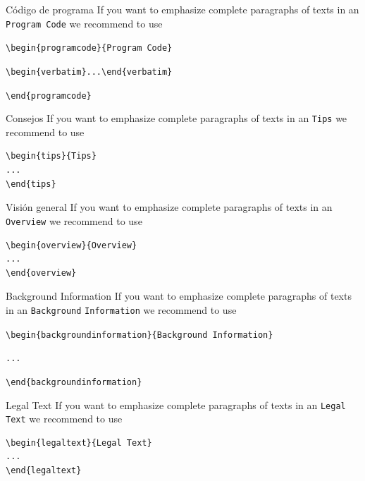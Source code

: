\begin{programcode}{Código de programa}
If you want to emphasize complete paragraphs of texts in an \verb|Program Code| we recommend to
use

\verb|\begin{programcode}{Program Code}|

\verb|\begin{verbatim}...\end{verbatim}|

\verb|\end{programcode}|

\end{programcode}
%
\begin{tips}{Consejos}
If you want to emphasize complete paragraphs of texts in an \verb|Tips| we recommend to
use  \begin{verbatim}\begin{tips}{Tips}
...
\end{tips}\end{verbatim}
\end{tips}
%
%
\begin{overview}{Visión general}
If you want to emphasize complete paragraphs of texts in an \verb|Overview| we recommend to
use  \begin{verbatim}\begin{overview}{Overview}
...
\end{overview}\end{verbatim}
\end{overview}
\clearpage
\begin{backgroundinformation}{Background Information}
If you want to emphasize complete paragraphs of texts in an \verb|Background|
\verb|Information| we recommend to
use

\verb|\begin{backgroundinformation}{Background Information}|

\verb|...|

\verb|\end{backgroundinformation}|
\end{backgroundinformation}
\begin{legaltext}{Legal Text}
If you want to emphasize complete paragraphs of texts in an \verb|Legal Text| we recommend to
use  \begin{verbatim}\begin{legaltext}{Legal Text}
...
\end{legaltext}\end{verbatim}
\end{legaltext}

